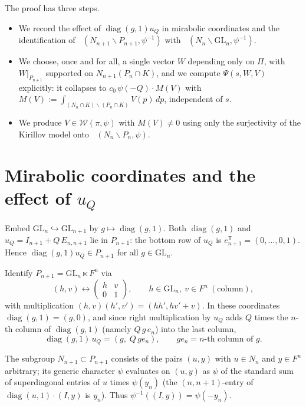 \documentclass[12pt]{article}
\newcommand{\GL}{\mathrm{GL}}
\newcommand{\Wmod}{\mathcal{W}}
\newcommand{\diag}{\operatorname{diag}}
\DeclareMathOperator{\Cc}{C_c^\infty}
\begin{document}
The proof has three steps.
\begin{itemize}
\item[(A)] We record the effect of $\diag(g,1)u_Q$ in mirabolic coordinates and the
identification of $\Cc(N_{n+1}\backslash P_{n+1},\psi^{-1})$ with
$\Cc(N_n\backslash\GL_n,\psi^{-1})$.
\item[(B)] We choose, once and for all, a single vector $W$ depending only on
$\Pi$, with $W|_{P_{n+1}}$ supported on $N_{n+1}(P_n\cap K)$, and we compute
$\Psi(s,W,V)$ explicitly: it collapses to $c_0\,\psi(-Q)\cdot M(V)$ with
$M(V):=\int_{(N_n\cap K)\backslash(P_n\cap K)}V(p)\,dp$, independent of $s$.
\item[(C)] We produce $V\in\Wmod(\pi,\psi)$ with $M(V)\neq0$ using only the
surjectivity of the Kirillov model onto $\Cc(N_n\backslash P_n,\psi)$.
\end{itemize}

\section{Mirabolic coordinates and the effect of $u_Q$}
\label{sec:mirabolic}

Embed $\GL_n\hookrightarrow\GL_{n+1}$ by $g\mapsto\diag(g,1)$. Both $\diag(g,1)$
and $u_Q=I_{n+1}+Q\,E_{n,n+1}$ lie in $P_{n+1}$: the bottom row of $u_Q$ is
$e_{n+1}^{\mathsf T}=(0,\dots,0,1)$. Hence $\diag(g,1)u_Q\in P_{n+1}$ for all
$g\in\GL_n$.

Identify $P_{n+1}=\GL_n\ltimes F^n$ via
\[
  (h,v)\longleftrightarrow\begin{pmatrix} h & v\\ 0 & 1\end{pmatrix},
  \qquad h\in\GL_n,\ v\in F^n\ (\text{column}),
\]
with multiplication $(h,v)(h',v')=(hh',hv'+v)$. In these coordinates
$\diag(g,1)=(g,0)$, and since right multiplication by $u_Q$ adds $Q$ times the
$n$-th column of $\diag(g,1)$ (namely $Q\,g\,e_n$) into the last column,
\begin{equation}\label{eq:uQ}
  \diag(g,1)\,u_Q=(g,\;Q\,g e_n),\qquad g e_n=\text{$n$-th column of }g.
\end{equation}

The subgroup $N_{n+1}\subset P_{n+1}$ consists of the pairs $(u,y)$ with $u\in N_n$
and $y\in F^n$ arbitrary; its generic character $\psi$ evaluates on $(u,y)$ as
$\psi$ of the standard sum of superdiagonal entries of $u$ times $\psi(y_n)$
(the $(n,n+1)$-entry of $\diag(u,1)\cdot(I,y)$ is $y_n$). Thus
$\psi^{-1}((I,y))=\psi(-y_n)$.
\end{document}
